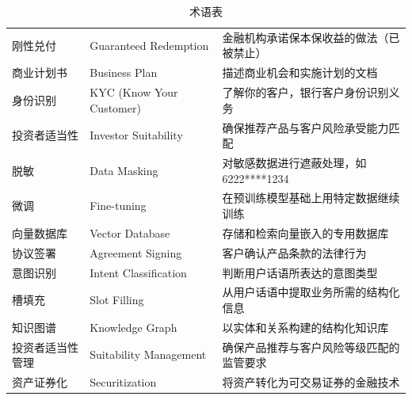\begin{table}[H]
\begin{longtable}{lp{2.5cm}p{7cm}}
刚性兑付 & Guaranteed Redemption & 金融机构承诺保本保收益的做法（已被禁止） \\
商业计划书 & Business Plan & 描述商业机会和实施计划的文档 \\
身份识别 & KYC (Know Your Customer) & 了解你的客户，银行客户身份识别义务 \\
投资者适当性 & Investor Suitability & 确保推荐产品与客户风险承受能力匹配 \\
脱敏 & Data Masking & 对敏感数据进行遮蔽处理，如6222****1234 \\
微调 & Fine-tuning & 在预训练模型基础上用特定数据继续训练 \\
向量数据库 & Vector Database & 存储和检索向量嵌入的专用数据库 \\
协议签署 & Agreement Signing & 客户确认产品条款的法律行为 \\
意图识别 & Intent Classification & 判断用户话语所表达的意图类型 \\
槽填充 & Slot Filling & 从用户话语中提取业务所需的结构化信息 \\
知识图谱 & Knowledge Graph & 以实体和关系构建的结构化知识库 \\
投资者适当性管理 & Suitability Management & 确保产品推荐与客户风险等级匹配的监管要求 \\
资产证券化 & Securitization & 将资产转化为可交易证券的金融技术 \\
\bottomrule
\end{longtable}
\caption{术语表}
\end{table}
